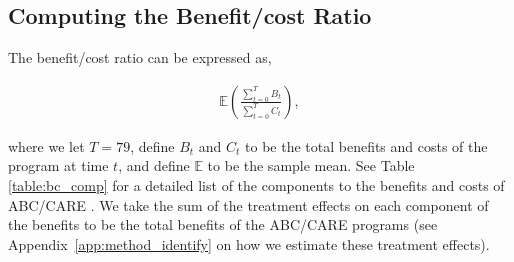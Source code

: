 


\subsection{Computing the Benefit/cost Ratio}
\label{app:method_cbratio}

\noindent The benefit/cost ratio can be expressed as,

\begin{align}
\mathbb{E} \left( \frac{ \sum_{t=0}^T B_t}{\sum_{t=0}^T C_t} \right),
\end{align}

\noindent where we let $T = 79$, define $B_t$ and $C_t$ to be the total benefits and costs of the
program at time $t$, and define $\mathbb{E}$ to be the sample mean. See Table \ref{table:bc_comp} for a detailed list of the components
to the benefits and costs of ABC/CARE . We take the sum of the treatment effects on each component
of the benefits to be the total benefits of the ABC/CARE programs (see Appendix~\ref{app:method_identify} on how we estimate these treatment effects). \\

